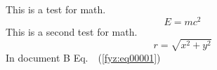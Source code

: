 \documentclass{scrbook}
\begin{document}
  \frontmatter
    
    \tableofcontents
  \mainmatter 
    \setcounter{page}{3} 

    This is a test for math.
    \begin{equation}
        E=mc^2 \label{mai:eq00001}
    \end{equation}
    This is a second test for math.
    \begin{equation}
        r = \sqrt{x^2 + y^2} \label{mai:eq00002}
    \end{equation}
    In document B Eq.~~(\ref{fyz:eq00001}) 

    
  \backmatter
\end{document}

